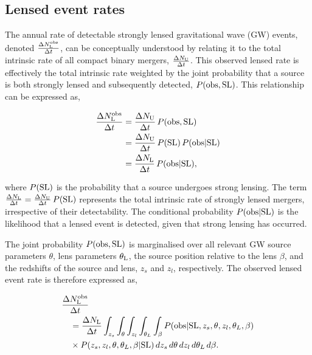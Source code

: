 \documentclass[aps,prd,twocolumn,superscriptaddress,groupedaddress,nofootinbib,showpacs,eqsecnum]{revtex4-1}
\begin{document}
\subsection{Lensed event rates}\label{sec:lensed_rates}

The annual rate of detectable strongly lensed gravitational wave (GW) events, denoted $\frac{\Delta N^{\rm obs}_{\rm L}}{\Delta t}$, can be conceptually understood by relating it to the total intrinsic rate of all compact binary mergers, $\frac{\Delta N_{\rm U}}{\Delta t}$. This observed lensed rate is effectively the total intrinsic rate weighted by the joint probability that a source is both strongly lensed and subsequently detected, $P({\rm obs, SL})$. This relationship can be expressed as,

\begin{align}
\frac{\Delta N^{\rm obs}_{\rm L}}{\Delta t} 
&= \frac{\Delta N_{\rm U}}{\Delta t} \, P({\rm obs, SL}) \nonumber \\
&= \frac{\Delta N_{\rm U}}{\Delta t} \, P({\rm SL}) \, P({\rm obs|SL}) \nonumber \\
&= \frac{\Delta N_{\rm L}}{\Delta t} \, P({\rm obs|SL}),
\label{eqn:lensed_event_rate}
\end{align}

where $P({\rm SL})$ is the probability that a source undergoes strong lensing. The term $\frac{\Delta N_{\rm L}}{\Delta t} = \frac{\Delta N_{\rm U}}{\Delta t} \, P({\rm SL})$ represents the total intrinsic rate of strongly lensed mergers, irrespective of their detectability. The conditional probability $P({\rm obs|SL})$ is the likelihood that a lensed event is detected, given that strong lensing has occurred.

The joint probability $P({\rm obs, SL})$ is marginalised over all relevant GW source parameters $\theta$, lens parameters $\theta_{\rm L}$, the source position relative to the lens $\beta$, and the redshifts of the source and lens, $z_s$ and $z_l$, respectively. The observed lensed event rate is therefore expressed as,

\begin{align}
&\frac{\Delta N^{\rm obs}_{\rm L}}{\Delta t} \notag\\
&\quad = \frac{\Delta N_{\rm L}}{\Delta t} \int_{z_s} \int_{\theta} \int_{z_l} \int_{\theta_L} \int_{\beta} P({\rm obs}|{\rm SL}, z_s, \theta, z_l, \theta_L, \beta)\notag \\
&\quad \times P(z_s, z_l, \theta, \theta_L, \beta|{\rm SL}) \, dz_s \, d\theta \, dz_l \, d\theta_L \, d\beta.
\label{eqn:lensed_event_rate_z}
\end{align}
\end{document}
